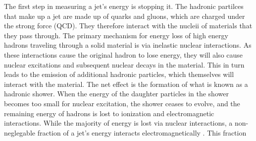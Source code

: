 The first step in measuring a jet's energy is stopping it.  
The hadronic partilces that make up a jet are made up of quarks and gluons, which are charged under the strong force (QCD).
They therefore interact with the nucleii of materials that they pass through.
The primary mechanism for energy loss of high energy hadrons traveling through a solid material is via inelastic nuclear interactions.
As these interactions cause the original hadron to lose energy, they will also cause nuclear excitations and subsequent nuclear decays in the material.
This in turn leads to the emission of additional hadronic particles, which themselves will interact with the material.
The net effect is the formation of what is known as a hadronic shower.
When the energy of the daughter particles in the shower becomes too small for nuclear excitation, the shower ceases to evolve, and the remaining energy of hadrons is lost to ionization and electromagnetic interactions.
While the majority of energy is lost via nuclear interactions, a non-neglegable fraction of a jet's energy interacts electromagnetically .
This fraction 


